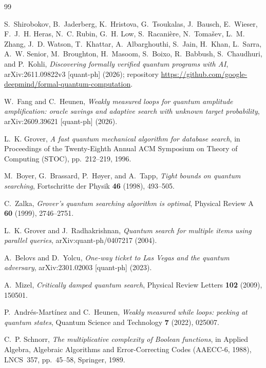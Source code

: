 \documentclass[11pt,a4paper]{article}
\theoremstyle{definition}
\theoremstyle{remark}
\begin{document}
\begin{thebibliography}{99}\small\setlength{\itemsep}{2pt plus 1pt}

S.~Shirobokov, B.~Jaderberg, K.~Hristova, G.~Tsoukalas, J.~Bausch, E.~Wieser, F.~J.~H. Heras, N.~C. Rubin, G.~H. Low, S.~Racani\`ere, N.~Toma\v{s}ev, L.~M. Zhang, J.~D. Watson, T.~Khattar, A.~Albarghouthi, S.~Jain, H.~Khan, L.~Sarra, A.~W. Senior, M.~Broughton, H.~Masoom, S.~Boixo, R.~Babbush, S.~Chaudhuri, and P.~Kohli,
\emph{Discovering formally verified quantum programs with AI},
arXiv:2611.09822v3 [quant-ph] (2026); repository \url{https://github.com/google-deepmind/formal-quantum-computation}.

W.~Fang and C.~Heunen,
\emph{Weakly measured loops for quantum amplitude amplification: oracle savings and adaptive search with unknown target probability},
arXiv:2609.39621 [quant-ph] (2026).

L.~K. Grover,
\emph{A fast quantum mechanical algorithm for database search},
in Proceedings of the Twenty-Eighth Annual ACM Symposium on Theory of Computing (STOC), pp.~212--219, 1996.

M.~Boyer, G.~Brassard, P.~H{\o}yer, and A.~Tapp,
\emph{Tight bounds on quantum searching},
Fortschritte der Physik \textbf{46} (1998), 493--505.

C.~Zalka,
\emph{Grover's quantum searching algorithm is optimal},
Physical Review A \textbf{60} (1999), 2746--2751.

L.~K. Grover and J.~Radhakrishnan,
\emph{Quantum search for multiple items using parallel queries},
arXiv:quant-ph/0407217 (2004).

A.~Belovs and D.~Yolcu,
\emph{One-way ticket to Las Vegas and the quantum adversary},
arXiv:2301.02003 [quant-ph] (2023).

A.~Mizel,
\emph{Critically damped quantum search},
Physical Review Letters \textbf{102} (2009), 150501.

P.~Andr\'es-Mart\'inez and C.~Heunen,
\emph{Weakly measured while loops: peeking at quantum states},
Quantum Science and Technology \textbf{7} (2022), 025007.

C.~P. Schnorr,
\emph{The multiplicative complexity of Boolean functions},
in Applied Algebra, Algebraic Algorithms and Error-Correcting Codes (AAECC-6, 1988), LNCS~357, pp.~45--58, Springer, 1989.


\end{thebibliography}
\end{document}
